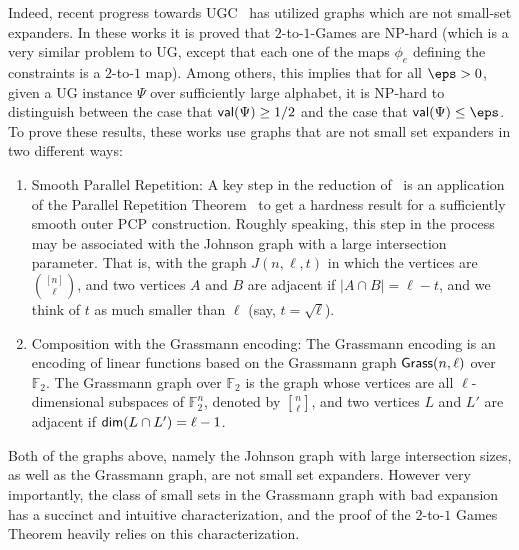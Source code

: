 Indeed, recent progress towards UGC~\cite{KhotMS17,DBLP:conf/stoc/DinurKKMS18a,DinurKKMS18,KhotMS18}
has utilized graphs which are not small-set expanders. In these 
works it is proved that $2$-to-$1$-Games are NP-hard (which is a 
very similar problem to UG, except that 
each one of the maps $\phi_e$ defining the constraints 
is a $2$-to-$1$ map). Among others, this implies that for all $\eps > 0$, given
a UG instance $\Psi$ over sufficiently large alphabet, 
it is NP-hard to distinguish between the case that 
${\sf val}(\Psi)\geq 1/2$ and the case that 
${\sf val}(\Psi)\leq \eps$. To prove these results, these works
use graphs that are not small set expanders in two different ways:
\begin{enumerate}
    \item Smooth Parallel Repetition: A key step in the reduction     of~\cite{KhotMS17,DBLP:conf/stoc/DinurKKMS18a,DinurKKMS18,KhotMS18} is an application of the Parallel Repetition Theorem~\cite{Raz} to get a hardness result 
    for a sufficiently 
    smooth outer PCP construction. Roughly speaking, this 
    step in the process may be associated with the Johnson graph
    with a large intersection parameter. That is, with the graph 
    $J(n,\ell,t)$ in which the vertices are $\binom{[n]}{\ell}$, and 
    two vertices $A$ and $B$ are adjacent if $|A\cap B|=\ell-t$, 
    and we think of $t$ as much smaller than $\ell$ (say, $t=\sqrt{\ell}$).
    \item Composition with the Grassmann encoding: The Grassmann
    encoding is an encoding of linear functions based on the Grassmann graph 
    ${\sf Grass}(n,\ell)$ over $\mathbb{F}_2$. The Grassmann graph 
    over $\mathbb{F}_2$ is the graph whose vertices are all 
    $\ell$-dimensional subspaces of $\mathbb{F}_2^n$, denoted by 
    ${n\brack \ell}$, and two vertices $L$ and $L'$ are adjacent if 
    ${\sf dim}(L\cap L') = \ell-1$. 
\end{enumerate}
Both of the graphs above, namely the Johnson graph with large intersection sizes, as well as the Grassmann graph, are not 
small set expanders. However very importantly, the class
of small sets in the Grassmann graph with bad expansion has a succinct and intuitive characterization, 
and the proof of the $2$-to-$1$ Games Theorem heavily relies on this characterization. 

